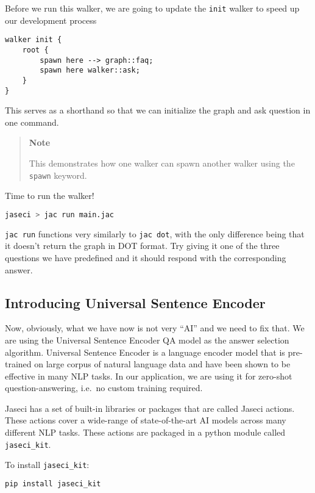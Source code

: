 Before we run this walker, we are going to update the \lstinline!init!
walker to speed up our development process

\begin{lstlisting}
walker init {
    root {
        spawn here --> graph::faq;
        spawn here walker::ask;
    }
}
\end{lstlisting}

This serves as a shorthand so that we can initialize the graph and ask
question in one command.

\begin{quote}
\textbf{Note}

This demonstrates how one walker can spawn another walker using the
\lstinline!spawn! keyword.
\end{quote}

Time to run the walker!

\begin{lstlisting}[language=bash]
jaseci > jac run main.jac
\end{lstlisting}

\lstinline!jac run! functions very similarly to \lstinline!jac dot!,
with the only difference being that it doesn't return the graph in DOT
format. Try giving it one of the three questions we have predefined and
it should respond with the corresponding answer.

\subsection{Introducing Universal Sentence
Encoder}\label{introducing-universal-sentence-encoder}

Now, obviously, what we have now is not very ``AI'' and we need to fix
that. We are using the Universal Sentence Encoder QA model as the answer
selection algorithm. Universal Sentence Encoder is a language encoder
model that is pre-trained on large corpus of natural language data and
have been shown to be effective in many NLP tasks. In our application,
we are using it for zero-shot question-answering, i.e.~no custom
training required.

Jaseci has a set of built-in libraries or packages that are called
Jaseci actions. These actions cover a wide-range of state-of-the-art AI
models across many different NLP tasks. These actions are packaged in a
python module called \lstinline!jaseci_kit!.

To install \lstinline!jaseci_kit!:

\begin{lstlisting}[language=bash]
pip install jaseci_kit
\end{lstlisting}

